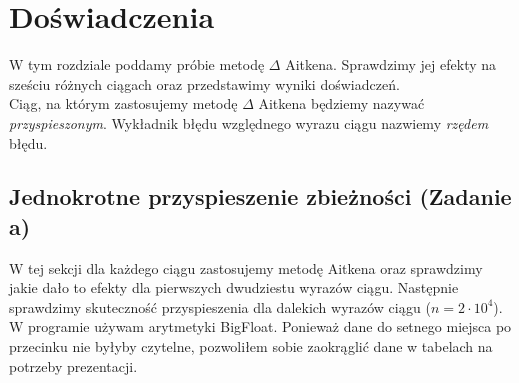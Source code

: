 \documentclass{article}
\begin{document}
\section{Doświadczenia}
W tym rozdziale poddamy próbie metodę $\Delta$ Aitkena. Sprawdzimy jej efekty na sześciu różnych ciągach oraz przedstawimy wyniki doświadczeń.\\
Ciąg, na którym zastosujemy metodę $\Delta$ Aitkena będziemy nazywać \emph{przyspieszonym}. Wykładnik błędu względnego wyrazu ciągu nazwiemy \emph{rzędem} błędu.

\subsection{Jednokrotne przyspieszenie zbieżności (Zadanie a)}
W tej sekcji dla każdego ciągu zastosujemy metodę Aitkena oraz sprawdzimy jakie dało to efekty dla pierwszych dwudziestu wyrazów ciągu. 
Następnie sprawdzimy skuteczność przyspieszenia dla dalekich wyrazów ciągu ($n = 2 \cdot 10^4$). W programie używam arytmetyki BigFloat. Ponieważ dane do setnego miejsca po przecinku nie byłyby czytelne, pozwoliłem sobie zaokrąglić dane w tabelach na potrzeby prezentacji.
\end{document}
